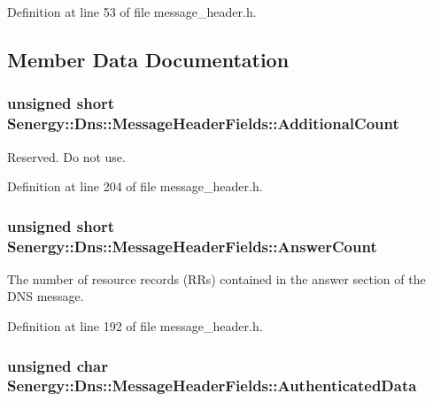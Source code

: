 Definition at line 53 of file message\-\_\-header.\-h.



\subsection{Member Data Documentation}
\hypertarget{struct_senergy_1_1_dns_1_1_message_header_fields_aae6ba21a1c8baa30f0aafe90d165420f}{
\subsubsection[{Additional\-Count}]{\setlength{\rightskip}{0pt plus 5cm}unsigned short Senergy\-::\-Dns\-::\-Message\-Header\-Fields\-::\-Additional\-Count}}\label{struct_senergy_1_1_dns_1_1_message_header_fields_aae6ba21a1c8baa30f0aafe90d165420f}


Reserved. Do not use. 



Definition at line 204 of file message\-\_\-header.\-h.

\hypertarget{struct_senergy_1_1_dns_1_1_message_header_fields_a38e5101ec862c400628d66192c5b9878}{
\subsubsection[{Answer\-Count}]{\setlength{\rightskip}{0pt plus 5cm}unsigned short Senergy\-::\-Dns\-::\-Message\-Header\-Fields\-::\-Answer\-Count}}\label{struct_senergy_1_1_dns_1_1_message_header_fields_a38e5101ec862c400628d66192c5b9878}


The number of resource records (R\-Rs) contained in the answer section of the D\-N\-S message. 



Definition at line 192 of file message\-\_\-header.\-h.

\hypertarget{struct_senergy_1_1_dns_1_1_message_header_fields_a3788cbe9e2663b3be0cad8cbca8dc985}{
\subsubsection[{Authenticated\-Data}]{\setlength{\rightskip}{0pt plus 5cm}unsigned char Senergy\-::\-Dns\-::\-Message\-Header\-Fields\-::\-Authenticated\-Data}}\label{struct_senergy_1_1_dns_1_1_message_header_fields_a3788cbe9e2663b3be0cad8cbca8dc985}


